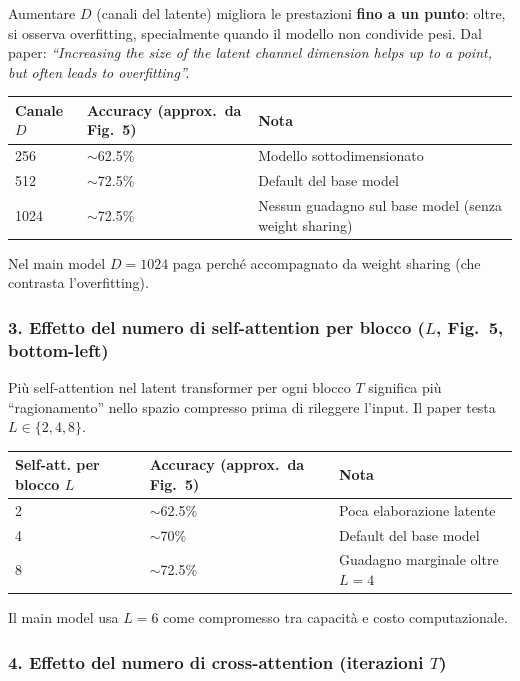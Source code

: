 \documentclass[
  11pt,
]{article}
\begin{document}
Aumentare $D$ (canali del latente) migliora le prestazioni \textbf{fino a un punto}: oltre, si osserva overfitting, specialmente quando il modello non condivide pesi. Dal paper: \emph{``Increasing the size of the latent channel dimension helps up to a point, but often leads to overfitting''.}

{\small
\begin{longtable}{@{}p{3cm} p{3cm} p{6cm}@{}}
\toprule
\textbf{Canale $D$} & \textbf{Accuracy (approx.\ da Fig.\ 5)} & \textbf{Nota} \\
\midrule
\endhead
256  & $\sim$62.5\% & Modello sottodimensionato \\[2pt]
512  & $\sim$72.5\% & Default del base model \\[2pt]
1024 & $\sim$72.5\% & Nessun guadagno sul base model (senza weight sharing) \\[2pt]
\bottomrule
\end{longtable}
}

Nel main model $D = 1024$ paga perché accompagnato da weight sharing (che contrasta l'overfitting).

\subsubsection*{3. Effetto del numero di self-attention per blocco ($L$, Fig.\ 5, bottom-left)}

Più self-attention nel latent transformer per ogni blocco $T$ significa più ``ragionamento'' nello spazio compresso prima di rileggere l'input. Il paper testa $L \in \{2, 4, 8\}$.

{\small
\begin{longtable}{@{}p{4cm} p{3cm} p{5cm}@{}}
\toprule
\textbf{Self-att. per blocco $L$} & \textbf{Accuracy (approx.\ da Fig.\ 5)} & \textbf{Nota} \\
\midrule
\endhead
2 & $\sim$62.5\% & Poca elaborazione latente \\[2pt]
4 & $\sim$70\%   & Default del base model \\[2pt]
8 & $\sim$72.5\% & Guadagno marginale oltre $L = 4$ \\[2pt]
\bottomrule
\end{longtable}
}

Il main model usa $L = 6$ come compromesso tra capacità e costo computazionale.

\subsubsection*{4. Effetto del numero di cross-attention (iterazioni $T$)}
\end{document}
